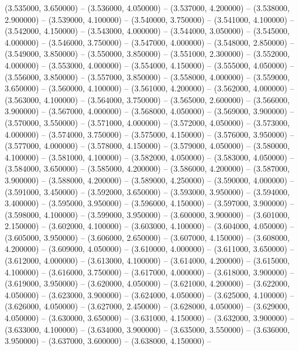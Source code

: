 (3.535000, 3.650000) -- 
(3.536000, 4.050000) -- 
(3.537000, 4.200000) -- 
(3.538000, 2.900000) -- 
(3.539000, 4.100000) -- 
(3.540000, 3.750000) -- 
(3.541000, 4.100000) -- 
(3.542000, 4.150000) -- 
(3.543000, 4.000000) -- 
(3.544000, 3.050000) -- 
(3.545000, 4.000000) -- 
(3.546000, 3.750000) -- 
(3.547000, 4.000000) -- 
(3.548000, 2.850000) -- 
(3.549000, 3.850000) -- 
(3.550000, 3.850000) -- 
(3.551000, 2.300000) -- 
(3.552000, 4.000000) -- 
(3.553000, 4.000000) -- 
(3.554000, 4.150000) -- 
(3.555000, 4.050000) -- 
(3.556000, 3.850000) -- 
(3.557000, 3.850000) -- 
(3.558000, 4.000000) -- 
(3.559000, 3.650000) -- 
(3.560000, 4.100000) -- 
(3.561000, 4.200000) -- 
(3.562000, 4.000000) -- 
(3.563000, 4.100000) -- 
(3.564000, 3.750000) -- 
(3.565000, 2.600000) -- 
(3.566000, 3.900000) -- 
(3.567000, 4.000000) -- 
(3.568000, 4.050000) -- 
(3.569000, 3.900000) -- 
(3.570000, 3.550000) -- 
(3.571000, 4.000000) -- 
(3.572000, 4.050000) -- 
(3.573000, 4.000000) -- 
(3.574000, 3.750000) -- 
(3.575000, 4.150000) -- 
(3.576000, 3.950000) -- 
(3.577000, 4.000000) -- 
(3.578000, 4.150000) -- 
(3.579000, 4.050000) -- 
(3.580000, 4.100000) -- 
(3.581000, 4.100000) -- 
(3.582000, 4.050000) -- 
(3.583000, 4.050000) -- 
(3.584000, 3.650000) -- 
(3.585000, 4.200000) -- 
(3.586000, 4.200000) -- 
(3.587000, 3.900000) -- 
(3.588000, 4.200000) -- 
(3.589000, 4.250000) -- 
(3.590000, 4.000000) -- 
(3.591000, 3.450000) -- 
(3.592000, 3.650000) -- 
(3.593000, 3.950000) -- 
(3.594000, 3.400000) -- 
(3.595000, 3.950000) -- 
(3.596000, 4.150000) -- 
(3.597000, 3.900000) -- 
(3.598000, 4.100000) -- 
(3.599000, 3.950000) -- 
(3.600000, 3.900000) -- 
(3.601000, 2.150000) -- 
(3.602000, 4.100000) -- 
(3.603000, 4.100000) -- 
(3.604000, 4.050000) -- 
(3.605000, 3.950000) -- 
(3.606000, 2.650000) -- 
(3.607000, 4.150000) -- 
(3.608000, 4.200000) -- 
(3.609000, 4.050000) -- 
(3.610000, 4.000000) -- 
(3.611000, 3.650000) -- 
(3.612000, 4.000000) -- 
(3.613000, 4.100000) -- 
(3.614000, 4.200000) -- 
(3.615000, 4.100000) -- 
(3.616000, 3.750000) -- 
(3.617000, 4.000000) -- 
(3.618000, 3.900000) -- 
(3.619000, 3.950000) -- 
(3.620000, 4.050000) -- 
(3.621000, 4.200000) -- 
(3.622000, 4.050000) -- 
(3.623000, 3.900000) -- 
(3.624000, 4.050000) -- 
(3.625000, 4.100000) -- 
(3.626000, 4.050000) -- 
(3.627000, 2.450000) -- 
(3.628000, 4.050000) -- 
(3.629000, 4.050000) -- 
(3.630000, 3.650000) -- 
(3.631000, 4.150000) -- 
(3.632000, 3.900000) -- 
(3.633000, 4.100000) -- 
(3.634000, 3.900000) -- 
(3.635000, 3.550000) -- 
(3.636000, 3.950000) -- 
(3.637000, 3.600000) -- 
(3.638000, 4.150000) -- 
